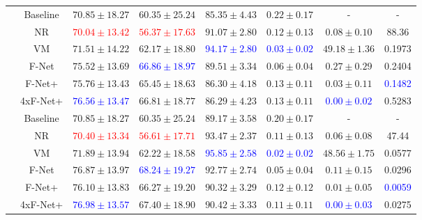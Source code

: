 \begin{table}[h]
\begin{tabular}{c c c c c c c c}
		\midrule
		\multirow{6}{*}{\rotatebox{90}{$R=8$}} & Baseline & $70.85 \pm 18.27$ & $60.35 \pm 25.24$ & $85.35 \pm 4.43$ & $0.22 \pm 0.17$ & - & -\\  
		 & NR & \textcolor{red}{$70.04 \pm 13.42$} & \textcolor{red}{$56.37 \pm 17.63$} & $91.07 \pm 2.80$ & $0.12 \pm 0.13$ & $0.08 \pm 0.10$ & 88.36 \\
		 & VM & $71.51 \pm 14.22$ & $62.17 \pm 18.80$ & \textcolor{blue}{$94.17 \pm 2.80$} & \textcolor{blue}{$0.03 \pm 0.02$} & $49.18 \pm 1.36$ & 0.1973\\	
		 & F-Net & $75.52 \pm 13.69$ & \textcolor{blue}{$66.86 \pm 18.97$} & $89.51 \pm 3.34$ & $0.06 \pm 0.04$ & $0.27 \pm 0.29$ & 0.2404\\ 
		 & F-Net+ & $75.76 \pm 13.43$ & $65.45 \pm 18.63$ & $86.30 \pm 4.18$ & $0.13 \pm 0.11$ & $0.03 \pm 0.11$ & \textcolor{blue}{0.1482}\\ 
		 & 4xF-Net+ & \textcolor{blue}{$76.56 \pm 13.47$} & $66.81 \pm 18.77$ & $86.29 \pm 4.23$ & $0.13 \pm 0.11$ & \textcolor{blue}{$0.00 \pm 0.02$} & 0.5283\\ 
		 	 
		\midrule		
		\multirow{6}{*}{\rotatebox{90}{$R=10$}} & Baseline & $70.85 \pm 18.27$ & $60.35 \pm 25.24$ & $89.17 \pm 3.58$ & $0.20 \pm 0.17$ & - & -\\ 
		 & NR & \textcolor{red}{$70.40 \pm 13.34$} & \textcolor{red}{$56.61 \pm 17.71$} & $93.47 \pm 2.37$ & $0.11 \pm 0.13$ & $0.06 \pm 0.08$ & 47.44 \\
		 & VM & $71.89 \pm 13.94$ & $62.22 \pm 18.58$ & \textcolor{blue}{$95.85 \pm 2.58$} & \textcolor{blue}{$0.02 \pm 0.02$} & $48.56 \pm 1.75$ & 0.0577\\	 %
		 & F-Net & $76.87 \pm 13.97$ & \textcolor{blue}{$68.24 \pm 19.27$} & $92.77 \pm 2.74$ & $0.05 \pm 0.04$ & $0.11 \pm 0.15$ & 0.0296\\ 
		 & F-Net+ & $76.10 \pm 13.83$ & $66.27 \pm 19.20$ & $90.32 \pm 3.29$ & $0.12 \pm 0.12$ & $0.01 \pm 0.05$ & \textcolor{blue}{0.0059}\\ 
		 & 4xF-Net+ & \textcolor{blue}{$76.98 \pm 13.57$} & $67.40 \pm 18.90$ & $90.42 \pm 3.33$ & $0.11 \pm 0.11$ & \textcolor{blue}{$0.00 \pm 0.03$} & 0.0275\\ 
		 \bottomrule
	\end{tabular}
\end{table}


